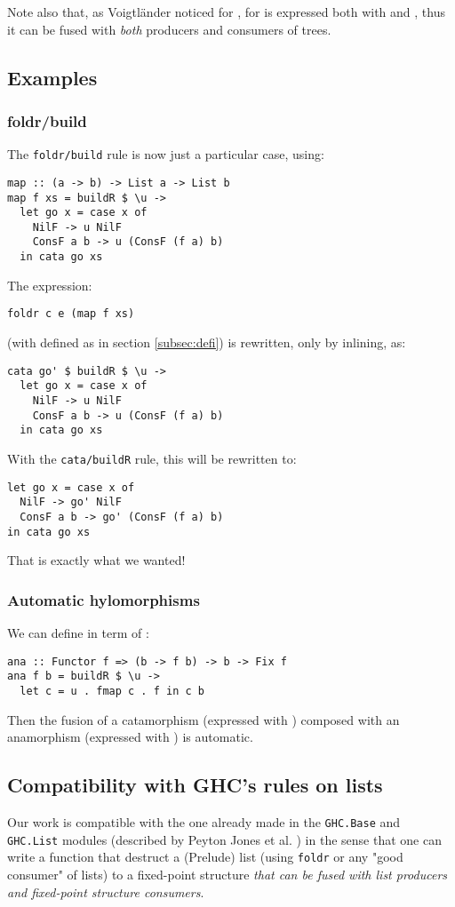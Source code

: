 Note also that, as Voigtländer \cite{Voigtlnder2008TypesFP} noticed for ,  for  is expressed both with  and , thus it can be fused with \emph{both} producers and consumers of trees.

\subsection{Examples}
\subsubsection{foldr/build}
The \verb|foldr/build| rule is now just a particular case, using:
\begin{verbatim}
map :: (a -> b) -> List a -> List b
map f xs = buildR $ \u ->
  let go x = case x of
    NilF -> u NilF
    ConsF a b -> u (ConsF (f a) b)
  in cata go xs
\end{verbatim}

\noindent The expression:
\begin{verbatim}
foldr c e (map f xs)
\end{verbatim}
(with  defined as in section \ref{subsec:defi}) is rewritten, only by inlining, as:
\begin{verbatim}
cata go' $ buildR $ \u ->
  let go x = case x of
    NilF -> u NilF
    ConsF a b -> u (ConsF (f a) b)
  in cata go xs
\end{verbatim}

\noindent With the \verb|cata/buildR| rule, this will be rewritten to:
\begin{verbatim}
let go x = case x of
  NilF -> go' NilF
  ConsF a b -> go' (ConsF (f a) b)
in cata go xs
\end{verbatim}
That is exactly what we wanted!

\subsubsection{Automatic hylomorphisms}
We can define  in term of :
\begin{verbatim}
ana :: Functor f => (b -> f b) -> b -> Fix f
ana f b = buildR $ \u ->
  let c = u . fmap c . f in c b
\end{verbatim}

\noindent Then the fusion of a catamorphism (expressed with ) composed with an anamorphism (expressed with ) is automatic.

\subsection{Compatibility with GHC's rules on lists}
Our work is compatible with the one already made in the \verb|GHC.Base| and \verb|GHC.List| modules (described by Peyton Jones et al. \cite{pbr}) in the sense that one can write a function that destruct a (Prelude) list (using \verb|foldr| or any "good consumer" of lists) to a fixed-point structure \emph{that can be fused with list producers and fixed-point structure consumers}.

